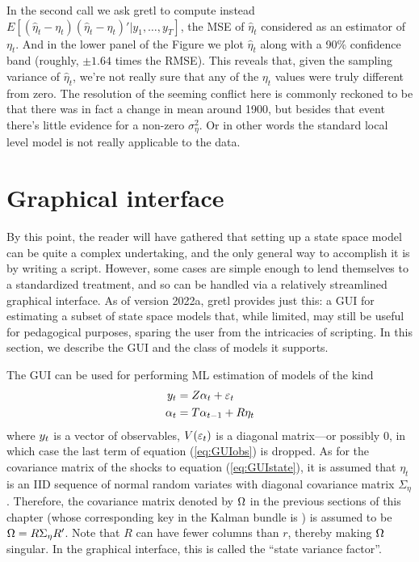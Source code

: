 In the second  call we ask gretl to compute instead
$E[(\hat{\eta}_t-\eta_t)(\hat{\eta}_t-\eta_t)' | y_1,\ldots,y_T]$, the
MSE of $\hat{\eta}_t$ considered as an estimator of $\eta_t$. And in
the lower panel of the Figure we plot $\hat{\eta}_t$ along with a 90\%
confidence band (roughly, $\pm 1.64$ times the RMSE). This reveals
that, given the sampling variance of $\hat{\eta}_t$, we're not really
sure that any of the $\eta_t$ values were truly different from
zero. The resolution of the seeming conflict here is commonly reckoned
to be that there was in fact a change in mean around 1900, but besides
that event there's little evidence for a non-zero
$\sigma^2_{\eta}$. Or in other words the standard local level model is
not really applicable to the data.

\section{Graphical interface}
\label{sec:kalman-gui}
\newcommand{\steta}{\eta}
\newcommand{\strR}{R}

By this point, the reader will have gathered that setting up a state
space model can be quite a complex undertaking, and the only general
way to accomplish it is by writing a script.  However, some cases are
simple enough to lend themselves to a standardized treatment, and so
can be handled via a relatively streamlined graphical interface.  As
of version 2022a, gretl provides just this: a GUI for estimating a
subset of state space models that, while limited, may still be useful
for pedagogical purposes, sparing the user from the intricacies of
scripting.  In this section, we describe the GUI and the class of
models it supports.

The GUI can be used for performing ML estimation of models of the kind
\begin{align}
  \label{eq:GUIobs}
  \obsvec_t & = \obsymat \statevec_{t} + \obsdist_t \\
  \label{eq:GUIstate}
  \statevec_{t} & = \statemat \statevec_{t-1} + \strR \steta_t
\end{align}
where $y_t$ is a vector of observables, $V(\varepsilon_t)$ is a
diagonal matrix---or possibly 0, in which case the last term of
equation (\ref{eq:GUIobs}) is dropped. As for the covariance matrix of
the shocks to equation (\ref{eq:GUIstate}), it is assumed that
$\steta_t$ is an IID sequence of normal random variates with diagonal
covariance matrix $\Sigma_\steta$. Therefore, the covariance matrix
denoted by $\Omega$ in the previous sections of this chapter (whose
corresponding key in the Kalman bundle is ) is assumed
to be $\statevar = R \Sigma_\steta R'$. Note that $\strR$ can have
fewer columns than $r$, thereby making $\Omega$ singular. In the
graphical interface, this is called the ``state variance factor''.

